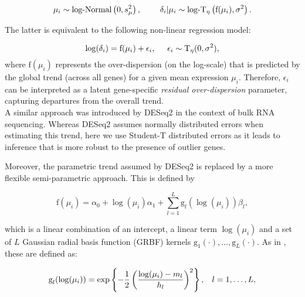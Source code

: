 \begin{equation} \label{eq::jointprior} \mu_i \sim \text{log-Normal}\left(0, s^2_{\mu}\right), \hspace{0.8cm}
\delta_i | \mu_i \sim \text{log-}\text{T}_{\eta}\left( \text{f}(\mu_i), \sigma^2 \right).
\end{equation} 

The latter is equivalent to the following non-linear regression model:

\begin{equation} \label{eq::regression}
\log(\delta_i) =\text{f}(\mu_i)+\epsilon_i, \hspace{0.5cm} \epsilon_i \sim{}\text{T}_{\eta}(0,\sigma^2), 
\end{equation} where $\text{f}(\mu_i)$ represents the over-dispersion (on the log-scale) that is predicted by the global trend (across all genes) for a given mean expression $\mu_i$. Therefore, $\epsilon_i$ can be interpreted as a latent gene-specific \textit{residual over-dispersion} parameter, capturing departures from the overall trend. \\

A similar approach was introduced by DESeq2 \citep{Love2014} in the context of bulk RNA sequencing. Whereas DESeq2 assumes normally distributed errors when estimating this trend, here we use Student-T distributed errors as it leads to inference that is more robust to the presence of outlier genes. 

\newpage

Moreover, the parametric trend assumed by DESeq2 is replaced by a more flexible semi-parametric approach. This is defined by

\begin{equation} \label{eq::trend}
\text{f}(\mu_i) = \alpha_0 + \log(\mu_i)\alpha_1 + \sum_{l=1}^L \text{g}_l(\log(\mu_i))\beta_l,
\end{equation} 

which is a linear combination of an intercept, a linear term $\log(\mu_i)$ and a set of $L$ Gaussian radial basis function (GRBF) kernels $\text{g}_1(\cdot), \ldots, \text{g}_L(\cdot)$. As in \cite{Kapourani2016}, these are defined as: 

\begin{equation} \label{eq::GRBF}
\text{g}_l(\log(\mu_i)) = \exp\left\lbrace-\frac{1}{2}\left(\dfrac{\log(\mu_i)-m_l}{h_l}\right)^2\right\rbrace, \hspace{0.3cm} l = 1, \ldots, L,
\end{equation} 

